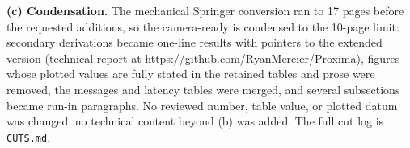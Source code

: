 \documentclass[10pt]{article}
\begin{document}
\textbf{(c) Condensation.} The mechanical Springer conversion ran to 17
pages before the requested additions, so the camera-ready is condensed to
the 10-page limit: secondary derivations became one-line results with
pointers to the extended version (technical report at
\url{https://github.com/RyanMercier/Proxima}), figures whose plotted values
are fully stated in the retained tables and prose were removed, the
messages and latency tables were merged, and several subsections became
run-in paragraphs. No reviewed number, table value, or plotted datum was
changed; no technical content beyond (b) was added. The full cut log is
\texttt{CUTS.md}.
\end{document}
